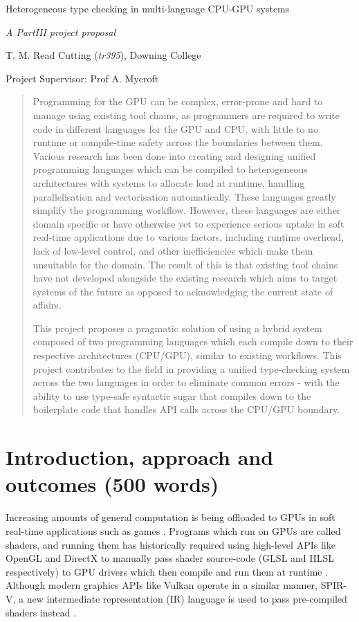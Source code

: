 \documentclass[11pt]{article}
\begin{document}
\centerline{\Large Heterogeneous type checking in multi-language CPU-GPU systems}
\vspace{2em}
\centerline{\Large \emph{A PartIII project proposal}}
\vspace{2em}
\centerline{\large T. M. Read Cutting (\emph{tr395}), Downing College}
\vspace{1em}
\centerline{\large Project Supervisor: Prof A. Mycroft}
\vspace{1em}

\begin{abstract}

Programming for the GPU can be complex, error-prone and hard to manage using
existing tool chains, as programmers are required to write code in different
languages for the GPU and CPU, with little to no runtime or compile-time safety
across the boundaries between them. Various research has been done into
creating and designing unified programming languages which can be compiled to
heterogeneous architectures with systems to allocate load at runtime, handling
parallelisation and vectorisation automatically. These languages greatly
simplify the programming workflow. However, these languages are either domain
specific or have otherwise yet to experience serious uptake in soft real-time
applications due to various factors, including runtime overhead, lack of
low-level control, and other inefficiencies which make them unsuitable for the
domain. The result of this is that existing tool chains have not developed
alongside the existing research which aims to target systems of the future as
opposed to acknowledging the current state of affairs.

This project proposes a pragmatic solution of using a hybrid system composed of
two programming languages which each compile down to their respective
architectures (CPU/GPU), similar to existing workflows. This project
contributes to the field in providing a unified type-checking system across the
two languages in order to eliminate common errors - with the ability to use
type-safe syntactic sugar that compiles down to the boilerplate code that
handles API calls across the CPU/GPU boundary.

\end{abstract}

\section{Introduction, approach and outcomes (500 words)}

Increasing amounts of general computation is being offloaded to GPUs in soft
real-time applications such as games \cite{GPGPUTechniques2012}. Programs which
run on GPUs are called shaders, and running them has historically required
using high-level APIs like OpenGL and DirectX to manually pass shader
source-code (GLSL and HLSL respectively) to GPU drivers which then compile and
run them at runtime \cite{OpenGLWorkings} \cite{DirectXWorkings}. Although
modern graphics APIs like Vulkan \cite{Vulkan} operate in a similar manner,
SPIR-V, a new intermediate representation (IR) language is used to pass
pre-compiled shaders instead \cite{SPIR-V}.
\end{document}
